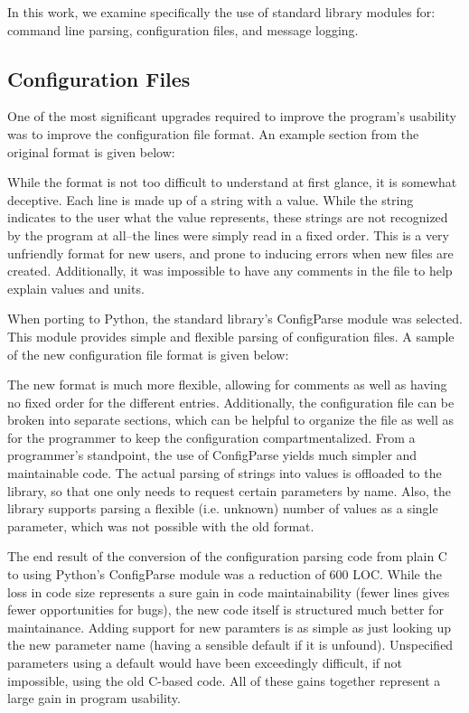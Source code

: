 \documentclass[twocolumn]{article}
\begin{document}
In this work, we examine specifically the use of standard library modules for:
command line parsing, configuration files, and message logging.

\subsection{Configuration Files}
One of the most significant upgrades required to improve the program's usability
was to improve the configuration file format. An example section from the original
format is given below:

  

While the format is not too difficult to understand at first glance, it is
somewhat deceptive. Each line is made up of a string with a value. While the
string indicates to the user what the value represents, these strings are not
recognized by the program at all--the lines were simply read in a fixed order.
This is a very unfriendly format for new users, and prone to inducing errors
when new files are created. Additionally, it was impossible to have any
comments in the file to help explain values and units.

When porting to Python, the standard library's ConfigParse module was selected.
This module provides simple and flexible parsing of configuration files. 
A sample of the new configuration file format is given below:



The new format is much more flexible, allowing for comments as well as having
no fixed order for the different entries. Additionally, the configuration file
can be broken into separate sections, which can be helpful to organize the file
as well as for the programmer to keep the configuration compartmentalized. From
a programmer's standpoint, the use of ConfigParse yields much simpler and 
maintainable code. The actual parsing of strings into values is offloaded to
the library, so that one only needs to request certain parameters by name.
Also, the library supports parsing a flexible (i.e. unknown) number of values
as a single parameter, which was not possible with the old format.

The end result of the conversion of the configuration parsing code from plain C
to using Python's ConfigParse module was a reduction of 600 LOC. While the loss
in code size represents a sure gain in code maintainability (fewer lines gives
fewer opportunities for bugs), the new code itself is structured much better
for maintainance. Adding support for new paramters is as simple as just looking
up the new parameter name (having a sensible default if it is unfound). Unspecified
parameters using a default would have been exceedingly difficult, if not impossible,
using the old C-based code. All of these gains together represent a large gain
in program usability.
\end{document}
